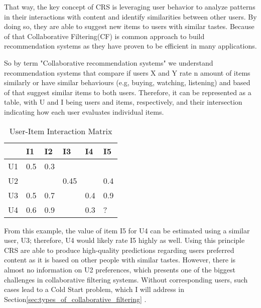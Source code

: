 \documentclass[10pt,a4paper]{article}
\begin{document}
\hspace{0.1cm}

That way, the key concept of CRS is leveraging user behavior to analyze patterns in their interactions with content and identify similarities between other users. By doing so, they are able to suggest new items to users with similar tastes. Because of that Collaborative Filtering(CF) is common approach to build recommendation systems as they have proven to be efficient in many applications.
\cite{kumar2015role}

\hspace{0.1cm}

So by term "Collaborative recommendation systems" we understand  recommendation systems that compare if users X and Y  rate n amount of items similarly or have similar behaviours (e.g, buying, watching, listening)  and based of that suggest similar items to both users\cite{10.1155/2009/421425}. Therefore, it can be represented as a table, with U and I being users and items, respectively, and their intersection indicating how each user evaluates individual items.

\hspace{0.1cm}

\begin{table}[h]
    \centering
    \begin{tabular}{ |C{1cm}|C{1cm}|C{1cm}|C{1cm}|C{1cm}|C{1cm}| }
    \hline
      & I1 & I2 & I3 & I4 & I5  \\ 
     \hline
     U1 & 0.5 & 0.3 &  &  &  \\  
     \hline
     U2 &  &  & 0.45 &  & 0.4 \\
     \hline
     U3 & 0.5 & 0.7 &  & 0.4 & 0.9 \\
     \hline
     U4 & 0.6 & 0.9 &  & 0.3 & ? \\
     \hline
    \end{tabular}
    \caption{User-Item Interaction Matrix} %
    \label{user-item-table} %
\end{table}

\hspace{0.1cm}

From this example, the value of item I5 for U4 can be estimated using a similar user, U3; therefore, U4 would likely rate I5 highly as well. Using this principle CRS are able to produce high-quality predictions regarding users preferred content as it is based on other people with similar tastes. However, there is almost no information on U2 preferences, which presents one of the biggest challenges in collaborative filtering systems. Without corresponding users, such cases lead to a Cold Start problem, which I will address in Section\ref{sec:types_of_collaborative_filtering} \cite{5283866}.
\end{document}
